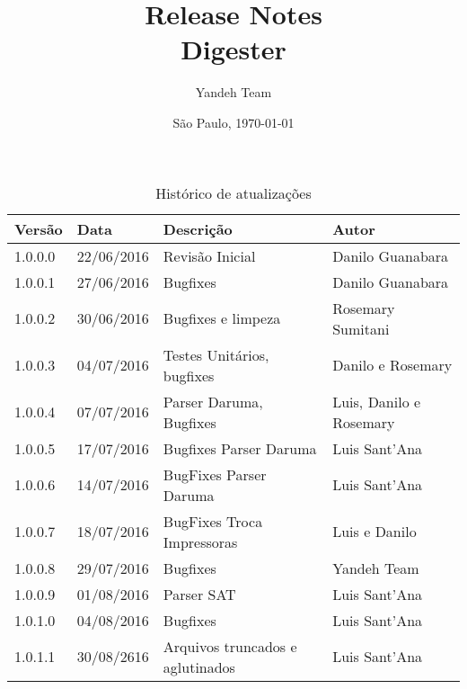 \documentclass{article}      %
\title{Release Notes \\
      Digester \versiondigester}  %
\author{Yandeh Team}              %
\date{São Paulo, \today}
\begin{document}

\maketitle                   %

\thispagestyle{firststyle}


\begin{table}[!ht]
\centering
\caption{Histórico de atualizações}
\label{my-label}
\begin{tabular}{|l|l|l|l|}
\hline
\textbf{Versão} & \textbf{Data} & \textbf{Descrição}                & \textbf{Autor}                                       \\ \hline
1.0.0.0           & 22/06/2016    & Revisão Inicial                 & Danilo Guanabara                                     \\ \hline
1.0.0.1           & 27/06/2016    & Bugfixes                        & Danilo Guanabara                                     \\ \hline
1.0.0.2           & 30/06/2016    & Bugfixes e limpeza              & Rosemary Sumitani                                    \\ \hline
1.0.0.3           & 04/07/2016    & Testes Unitários, bugfixes      & Danilo e Rosemary                                    \\ \hline
1.0.0.4           & 07/07/2016    & Parser Daruma, Bugfixes         & Luis, Danilo e Rosemary                              \\ \hline
1.0.0.5           & 17/07/2016    & Bugfixes Parser Daruma          & Luis Sant'Ana                                        \\ \hline
1.0.0.6           & 14/07/2016    & BugFixes Parser Daruma          & Luis Sant'Ana                                        \\ \hline  
1.0.0.7           & 18/07/2016    & BugFixes Troca Impressoras      & Luis e Danilo                                        \\ \hline
1.0.0.8           & 29/07/2016    & Bugfixes                        & Yandeh Team                                          \\ \hline
1.0.0.9           & 01/08/2016    & Parser SAT                      & Luis Sant'Ana                                        \\ \hline
1.0.1.0           & 04/08/2016    & Bugfixes                        & Luis Sant'Ana                                        \\ \hline
1.0.1.1           & 30/08/2616    & Arquivos truncados e aglutinados              & Luis Sant'Ana                                        \\ \hline        
\end{tabular}
\end{table}
\end{document}
